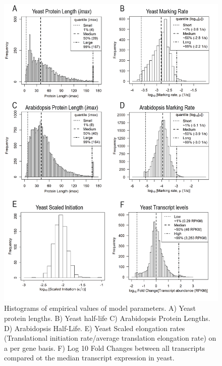 \documentclass[review]{elsarticle}
\begin{document}
\begin{figure}[!ht]
\centering
\includegraphics[width=120mm]{Images/2023-07-04_parameter_histograms.png}
\caption{Histograms of empirical values of model parameters. A) Yeast protein lengths. B) Yeast half-life C) Arabidopsis Protein Lengths. D) Arabidopsis Half-Life. E) Yeast Scaled elongation rates (Translational initiation rate/average translation elongation rate) on a per gene basis. F) Log 10 Fold Changes between all transcripts compared ot the median transcript expression in yeast. }
\end{figure}
		


\end{document}
